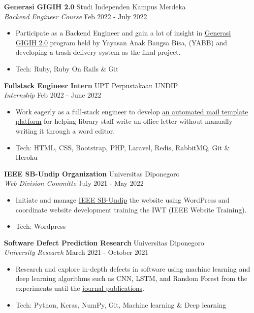 \documentclass[a4paper]{article}
\begin{document}
\textbf{Generasi GIGIH 2.0} \hfill Studi Independen Kampus Merdeka \\
\textit{Backend Engineer Course} \hfill Feb 2022 - July 2022\\
\vspace{-1mm}
\begin{itemize} \itemsep 1pt
	\item Participate as a Backend Engineer and gain a lot of insight in \href{https://www.anakbangsabisa.org/generasi-gigih/}{Generasi GIGIH 2.0} program held by Yayasan Anak Bangsa Bisa, (YABB) and developing a trash delivery system as the final project.
	\item Tech: Ruby, Ruby On Rails \& Git
\end{itemize}

\textbf{Fullstack Engineer Intern} \hfill UPT Perpustakaan UNDIP \\
\textit{Internship} \hfill Feb 2022 - June 2022\\
\vspace{-1mm}
\begin{itemize} \itemsep 1pt
	\item Work eagerly as a full-stack engineer to develop \href{http://template-surat-testing.herokuapp.com/}{an automated mail template platform} for helping library staff write an office letter without manually writing it through a word editor.
	\item Tech: HTML, CSS, Bootstrap, PHP, Laravel, Redis, RabbitMQ, Git \& Heroku
\end{itemize}

\textbf{IEEE SB-Undip Organization} \hfill Universitas Diponegoro\\
\textit{Web Division Committe} \hfill July 2021 - May 2022\\
\vspace{-1mm}
\begin{itemize} \itemsep 1pt
	\item Initiate and manage \href{https://edu.ieee.org/id-undip/}{IEEE SB-Undip} the website using WordPress and coordinate website development training the IWT (IEEE Website Training).
	\item Tech: Wordpress
\end{itemize}

\textbf{Software Defect Prediction Research} \hfill Universitas Diponegoro\\
\textit{University Research} \hfill March 2021 - October 2021\\
\vspace{-1mm}
\begin{itemize} \itemsep 1pt
	\item Research and explore in-depth defects in software using machine learning and deep learning algorithms such as CNN, LSTM, and Random Forest from the experiments until the
	\href{https://github.com/mhnaufal/Software-Defect-Finale/blob/main/reports/PAPER-Software%20Defect%20Prediction.pdf}{journal publications}.
	\item Tech: Python, Keras, NumPy, Git, Machine learning \& Deep learning
\end{itemize}
\end{document}

